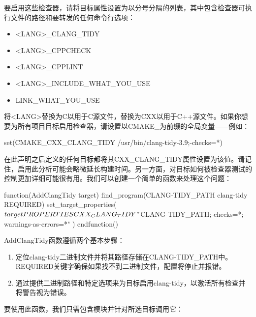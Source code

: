 要启用这些检查器，请将目标属性设置为以分号分隔的列表，其中包含检查器可执行文件的路径和要转发的任何命令行选项：

\begin{itemize}
\item
<LANG>\_CLANG\_TIDY

\item
<LANG>\_CPPCHECK

\item
<LANG>\_CPPLINT

\item
<LANG>\_INCLUDE\_WHAT\_YOU\_USE

\item
LINK\_WHAT\_YOU\_USE
\end{itemize}

将<LANG>替换为C以用于C源文件，替换为CXX以用于C++源文件。如果你想要为所有项目目标启用检查器，请设置以CMAKE\_为前缀的全局变量——例如：

\begin{shell}
set(CMAKE_CXX_CLANG_TIDY /usr/bin/clang-tidy-3.9;-checks=*)
\end{shell}

在此声明之后定义的任何目标都将其CXX\_CLANG\_TIDY属性设置为该值。请记住，启用此分析可能会略微延长构建时间。另一方面，对目标如何被检查器测试的控制更加详细可能很有用。我们可以创建一个简单的函数来处理这个问题：


\begin{cmake}
function(AddClangTidy target)
    find_program(CLANG-TIDY_PATH clang-tidy REQUIRED)
    set_target_properties(${target}
        PROPERTIES CXX_CLANG_TIDY
        "${CLANG-TIDY_PATH};-checks=*;--warnings-as-errors=*"
    )
endfunction()
\end{cmake}

AddClangTidy函数遵循两个基本步骤：

\begin{enumerate}
\item
定位clang-tidy二进制文件并将其路径存储在CLANG-TIDY\_PATH中。REQUIRED关键字确保如果找不到二进制文件，配置将停止并报错。

\item
通过提供二进制路径和特定选项来为目标启用clang-tidy，以激活所有检查并将警告视为错误。
\end{enumerate}

要使用此函数，我们只需包含模块并针对所选目标调用它：


